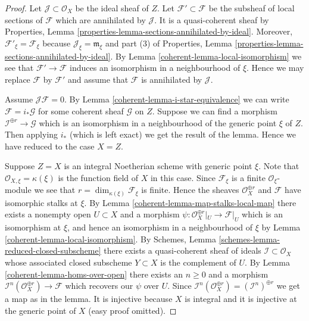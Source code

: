 \begin{proof}

Let $\mathcal{J} \subset \mathcal{O}_X$ be the ideal sheaf of $Z$.
Let $\mathcal{F}' \subset \mathcal{F}$ be the subsheaf of
local sections of $\mathcal{F}$ which are annihilated by
$\mathcal{J}$. It is a quasi-coherent sheaf by
Properties, Lemma \ref{properties-lemma-sections-annihilated-by-ideal}.
Moreover, $\mathcal{F}'_\xi = \mathcal{F}_\xi$ because
$\mathcal{J}_\xi = \mathfrak m_\xi$ and part (3) of
Properties, Lemma \ref{properties-lemma-sections-annihilated-by-ideal}.
By Lemma \ref{coherent-lemma-local-isomorphism} we see that
$\mathcal{F}' \to \mathcal{F}$
induces an isomorphism in a neighbourhood of $\xi$.
Hence we may replace $\mathcal{F}$ by $\mathcal{F}'$ and assume
that $\mathcal{F}$ is annihilated by $\mathcal{J}$.

\medskip\noindent
Assume $\mathcal{J}\mathcal{F} = 0$. By
Lemma \ref{coherent-lemma-i-star-equivalence} we can write
$\mathcal{F} = i_*\mathcal{G}$ for some coherent
sheaf $\mathcal{G}$ on $Z$. Suppose we can find a morphism
$\mathcal{I}^{\oplus r} \to \mathcal{G}$ which is an isomorphism
in a neighbourhood of the generic point $\xi$ of $Z$.
Then applying $i_*$ (which is left exact) we get the result of the lemma.
Hence we have reduced to the case $X = Z$.

\medskip\noindent
Suppose $Z = X$ is an integral Noetherian scheme with generic point $\xi$.
Note that $\mathcal{O}_{X, \xi} = \kappa(\xi)$ is the function field of $X$
in this case.
Since $\mathcal{F}_\xi$ is a finite $\mathcal{O}_\xi$-module we see
that $r = \dim_{\kappa(\xi)} \mathcal{F}_\xi$ is finite.
Hence the sheaves $\mathcal{O}_X^{\oplus r}$ and $\mathcal{F}$
have isomorphic stalks at $\xi$.
By Lemma \ref{coherent-lemma-map-stalks-local-map} there exists a nonempty
open $U \subset X$ and a morphism
$\psi : \mathcal{O}_X^{\oplus r}|_U \to \mathcal{F}|_U$
which is an isomorphism
at $\xi$, and hence an isomorphism in a neighbourhood of $\xi$ by
Lemma \ref{coherent-lemma-local-isomorphism}.
By Schemes, Lemma \ref{schemes-lemma-reduced-closed-subscheme}
there exists a quasi-coherent sheaf of ideals
$\mathcal{I} \subset \mathcal{O}_X$
whose associated closed subscheme $Y \subset X$ is the complement
of $U$.
By Lemma \ref{coherent-lemma-homs-over-open} there exists an $n \geq 0$ and a morphism
$\mathcal{I}^n(\mathcal{O}_X^{\oplus r}) \to \mathcal{F}$
which recovers our $\psi$ over $U$. Since
$\mathcal{I}^n(\mathcal{O}_X^{\oplus r}) = (\mathcal{I}^n)^{\oplus r}$
we get a map as in the lemma. It is injective because $X$ is
integral and it is injective at the generic point of $X$
(easy proof omitted).
\end{proof}

